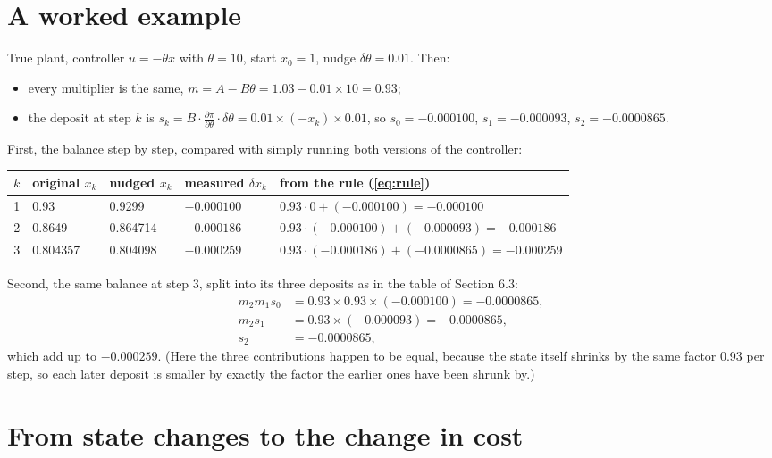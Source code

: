 \documentclass[11pt]{article}
\begin{document}
\section{A worked example}

True plant, controller $u=-\theta x$ with $\theta=10$, start $x_0=1$, nudge $\delta\theta=0.01$. Then:
\begin{itemize}
\item every multiplier is the same, $m=A-B\theta=1.03-0.01\times10=0.93$;
\item the deposit at step $k$ is $s_k=B\cdot\frac{\partial\pi}{\partial\theta}\cdot\delta\theta=0.01\times(-x_k)\times0.01$, so $s_0=-0.000100$, $s_1=-0.000093$, $s_2=-0.0000865$.
\end{itemize}

First, the balance step by step, compared with simply running both versions of the controller:

\begin{center}
\small
\begin{tabular}{rllll}
\toprule
$k$ & original $x_k$ & nudged $x_k$ & measured $\delta x_k$ & from the rule (\ref{eq:rule}) \\
\midrule
1 & 0.93 & 0.9299 & $-0.000100$ & $0.93\cdot0+(-0.000100)=-0.000100$ \\
2 & 0.8649 & 0.864714 & $-0.000186$ & $0.93\cdot(-0.000100)+(-0.000093)=-0.000186$ \\
3 & 0.804357 & 0.804098 & $-0.000259$ & $0.93\cdot(-0.000186)+(-0.0000865)=-0.000259$ \\
\bottomrule
\end{tabular}
\end{center}

Second, the same balance at step 3, split into its three deposits as in the table of Section 6.3:
\begin{align}
m_2 m_1 s_0&=0.93\times0.93\times(-0.000100)=-0.0000865,\\
m_2 s_1&=0.93\times(-0.000093)=-0.0000865,\\
s_2&=-0.0000865,
\end{align}
which add up to $-0.000259$. (Here the three contributions happen to be equal, because the state itself shrinks by the same factor 0.93 per step, so each later deposit is smaller by exactly the factor the earlier ones have been shrunk by.)

\section{From state changes to the change in cost}
\end{document}

